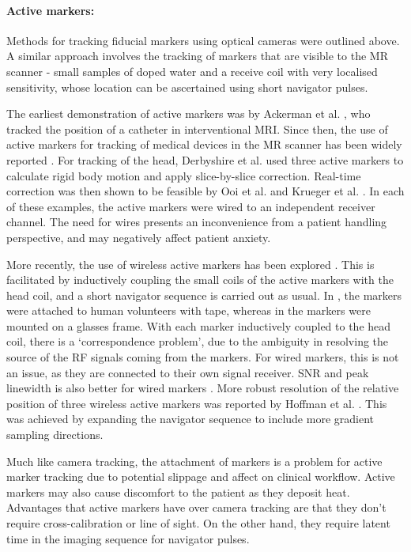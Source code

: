 \documentclass[class=article, crop=false]{standalone}
\begin{document}
\paragraph{Active markers:} Methods for tracking fiducial markers using optical cameras were outlined above. A similar approach involves the tracking of markers that are visible to the MR scanner - small samples of doped water and a receive coil with very localised sensitivity, whose location can be ascertained using short navigator pulses.
\par 
The earliest demonstration of active markers was by Ackerman et al. \parencite*{Ackerman1986}, who tracked the position of a catheter in interventional MRI. Since then, the use of active markers for tracking of medical devices in the MR scanner has been widely reported \parencite{Krueger2007,Coutts1998,Ladd1998,Kozerke2004,Dumoulin1993}. For tracking of the head, Derbyshire et al. \parencite*{Derbyshire1998} used three active markers to calculate rigid body motion and apply slice-by-slice correction. Real-time correction was then shown to be feasible by Ooi et al. \parencite*{Ooi2009} and Krueger et al. \parencite*{Krueger2006}. In each of these examples, the active markers were wired to an independent receiver channel. The need for wires presents an inconvenience from a patient handling perspective, and may negatively affect patient anxiety.
\par 
More recently, the use of wireless active markers has been explored \parencite{Sengupta2014,Ooi2013}. This is facilitated by inductively coupling the small coils of the active markers with the head coil, and a short navigator sequence is carried out as usual. In \parencite{Sengupta2014}, the markers were attached to human volunteers with tape, whereas in \parencite{Ooi2013} the markers were mounted on a glasses frame. With each marker inductively coupled to the head coil, there is a `correspondence problem', due to the ambiguity in resolving the source of the RF signals coming from the markers. For wired markers, this is not an issue, as they are connected to their own signal receiver. SNR and peak linewidth is also better for wired markers \parencite{Sengupta2014}. More robust resolution of the relative position of three wireless active markers was reported by Hoffman et al. \parencite*{Hoffmann2016}. This was achieved by expanding the navigator sequence to include more gradient sampling directions.
\par 
Much like camera tracking, the attachment of markers is a problem for active marker tracking due to potential slippage and affect on clinical workflow. Active markers may also cause discomfort to the patient as they deposit heat. Advantages that active markers have over camera tracking are that they don't require cross-calibration or line of sight. On the other hand, they require latent time in the imaging sequence for navigator pulses.
\end{document}
